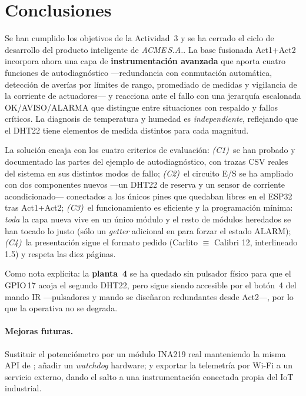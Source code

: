 \section{Conclusiones}
\label{sec:conclusiones}

Se han cumplido los objetivos de la Actividad~3 y se ha cerrado el ciclo de
desarrollo del producto inteligente de \emph{ACME\,S.A.}. La base fusionada
Act1+Act2 incorpora ahora una capa de \textbf{instrumentación avanzada} que
aporta cuatro funciones de autodiagnóstico ---redundancia con conmutación
automática, detección de averías por límites de rango, promediado de medidas
y vigilancia de la corriente de actuadores--- y reacciona ante el fallo con
una jerarquía escalonada \textsf{OK}/\textsf{AVISO}/\textsf{ALARMA} que
distingue entre situaciones con respaldo y fallos críticos. La diagnosis de
temperatura y humedad es \emph{independiente}, reflejando que el DHT22 tiene
elementos de medida distintos para cada magnitud.

La solución encaja con los cuatro criterios de evaluación: \emph{(C1)}\
se han probado y documentado las partes del ejemplo de autodiagnóstico, con
trazas CSV reales del sistema en sus distintos modos de fallo;
\emph{(C2)}\ el circuito E/S se ha ampliado con dos componentes nuevos ---un
DHT22 de reserva y un sensor de corriente acondicionado--- conectados a los
únicos pines que quedaban libres en el ESP32 tras Act1+Act2;
\emph{(C3)}\ el funcionamiento es eficiente y la programación mínima:
\emph{toda} la capa nueva vive en un único módulo \codein{diagnostics} y el
resto de módulos heredados se han tocado lo justo (sólo un \emph{getter}
adicional en \codein{elevator} para forzar el estado \textsf{ALARM});
\emph{(C4)}\ la presentación sigue el formato pedido (Carlito $\equiv$
Calibri 12, interlineado 1.5) y respeta las diez páginas.

Como nota explícita: la \textbf{planta~4} se ha quedado sin pulsador físico
para que el GPIO\,17 acoja el segundo DHT22, pero sigue siendo accesible por
el botón~4 del mando IR ---pulsadores y mando se diseñaron redundantes desde
Act2---, por lo que la operativa no se degrada.

\paragraph{Mejoras futuras.} Sustituir el potenciómetro por un módulo INA219
real manteniendo la misma API de \codein{diagnostics}; añadir un
\emph{watchdog} hardware; y exportar la telemetría por Wi-Fi a un servicio
externo, dando el salto a una instrumentación conectada propia del IoT
industrial.
